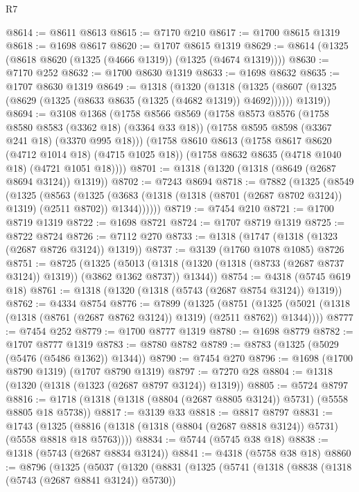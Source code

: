 \begin{lexlean}{R7}
\begin{coremodule}
@8614 := @8611 @8613
@8615 := @7170 @210
@8617 := @1700 @8615 @1319
@8618 := @1698 @8617
@8620 := @1707 @8615 @1319
@8629 := @8614 (@1325 (@8618 @8620 (@1325 (@4666 @1319)) (@1325 (@4674 @1319))))
@8630 := @7170 @252
@8632 := @1700 @8630 @1319
@8633 := @1698 @8632
@8635 := @1707 @8630 @1319
@8649 := @1318
    (@1320
      (@1318
        (@1325 (@8607 (@1325 (@8629 (@1325 (@8633 @8635 (@1325 (@4682 @1319)) @4692))))))
        @1319))
@8694 := @3108
    @1368
    (@1758
      @8566
      @8569
      (@1758
        @8573
        @8576
        (@1758 @8580 @8583 (@3362 @18) (@3364 @33 @18))
        (@1758 @8595 @8598 (@3367 @241 @18) (@3370 @995 @18)))
      (@1758
        @8610
        @8613
        (@1758 @8617 @8620 (@4712 @1014 @18) (@4715 @1025 @18))
        (@1758 @8632 @8635 (@4718 @1040 @18) (@4721 @1051 @18))))
@8701 := @1318 (@1320 (@1318 (@8649 (@2687 @8694 @3124)) @1319))
@8702 := @7243 @8694
@8718 := @7882
    (@1325
      (@8549
        (@1325
          (@8563
            (@1325
              (@3683 (@1318 (@1318 (@8701 (@2687 @8702 @3124)) @1319) (@2511 @8702)) @1344))))))
@8719 := @7454 @210
@8721 := @1700 @8719 @1319
@8722 := @1698 @8721
@8724 := @1707 @8719 @1319
@8725 := @8722 @8724
@8726 := @7112 @270
@8733 := @1318 (@1747 (@1318 (@1323 (@2687 @8726 @3124)) @1319))
@8737 := @3139 (@1760 @1078 @1085) @8726
@8751 := @8725
    (@1325
      (@5013 (@1318 (@1320 (@1318 (@8733 (@2687 @8737 @3124)) @1319)) (@3862 @1362 @8737)) @1344))
@8754 := @4318 (@5745 @619 @18)
@8761 := @1318 (@1320 (@1318 (@5743 (@2687 @8754 @3124)) @1319))
@8762 := @4334 @8754
@8776 := @7899
    (@1325
      (@8751 (@1325 (@5021 (@1318 (@1318 (@8761 (@2687 @8762 @3124)) @1319) (@2511 @8762)) @1344))))
@8777 := @7454 @252
@8779 := @1700 @8777 @1319
@8780 := @1698 @8779
@8782 := @1707 @8777 @1319
@8783 := @8780 @8782
@8789 := @8783 (@1325 (@5029 (@5476 (@5486 @1362)) @1344))
@8790 := @7454 @270
@8796 := @1698 (@1700 @8790 @1319) (@1707 @8790 @1319)
@8797 := @7270 @28
@8804 := @1318 (@1320 (@1318 (@1323 (@2687 @8797 @3124)) @1319))
@8805 := @5724 @8797
@8816 := @1718 (@1318 (@1318 (@8804 (@2687 @8805 @3124)) @5731) (@5558 @8805 @18 @5738))
@8817 := @3139 @33
@8818 := @8817 @8797
@8831 := @1743
    (@1325 (@8816 (@1318 (@1318 (@8804 (@2687 @8818 @3124)) @5731) (@5558 @8818 @18 @5763))))
@8834 := @5744 (@5745 @38 @18)
@8838 := @1318 (@5743 (@2687 @8834 @3124))
@8841 := @4318 (@5758 @38 @18)
@8860 := @8796
    (@1325
      (@5037
        (@1320
          (@8831
            (@1325
              (@5741
                (@1318
                  (@8838 (@1318 (@5743 (@2687 @8841 @3124)) @5730))

\end{coremodule}
\end{lexlean}
